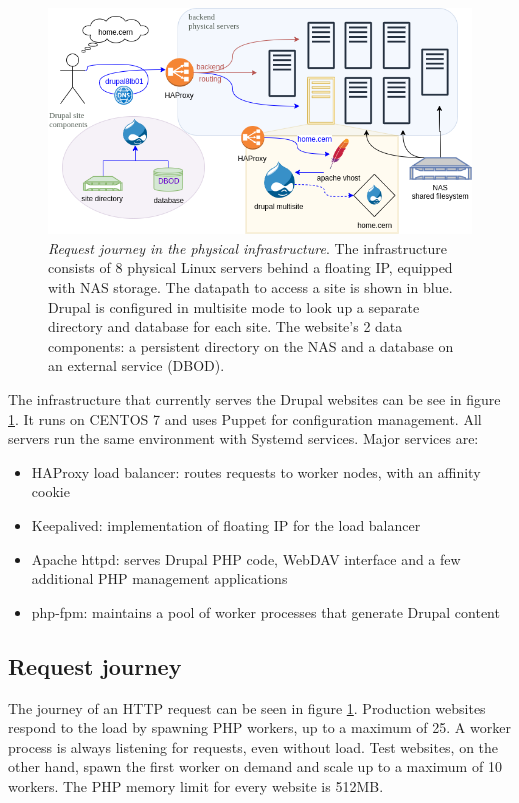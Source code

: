 \begin{figure}
    \centering
    \hspace{-2em}
    \includegraphics[width=.66\textwidth]{figures/drupal-physical-request-journey}
    \caption{\emph{Request journey in the physical infrastructure}.
    The infrastructure consists of 8 physical Linux servers behind a floating IP, equipped with NAS storage.
    The {\color{blue} datapath} to access a site is shown in blue. 
    Drupal is configured in multisite mode to look up a separate directory and database for each site.
    The website's {\color{asparagus} 2 data components}: a persistent directory on the NAS and a database on an external service (DBOD).
    }
    \label{fig:drupal-physical-request-journey}
\end{figure}

The infrastructure that currently serves the Drupal websites can be see in figure \ref{fig:drupal-physical-request-journey}.
It runs on CENTOS 7 and uses Puppet for configuration management.
All servers run the same environment with Systemd services.
Major services are:
\begin{itemize}
    \item HAProxy load balancer: routes requests to worker nodes, with an affinity cookie
    \item Keepalived: implementation of floating IP for the load balancer
    \item Apache httpd: serves Drupal PHP code, WebDAV interface and a few additional PHP management applications
    \item php-fpm: maintains a pool of worker processes that generate Drupal content
\end{itemize}

\subsection{Request journey}

The journey of an HTTP request can be seen in figure \ref{fig:drupal-physical-request-journey}.
Production websites respond to the load by spawning PHP workers, up to a maximum of 25.
A worker process is always listening for requests, even without load.
Test websites, on the other hand, spawn the first worker on demand and scale up to a maximum of 10 workers.
The PHP memory limit for every website is 512MB.


